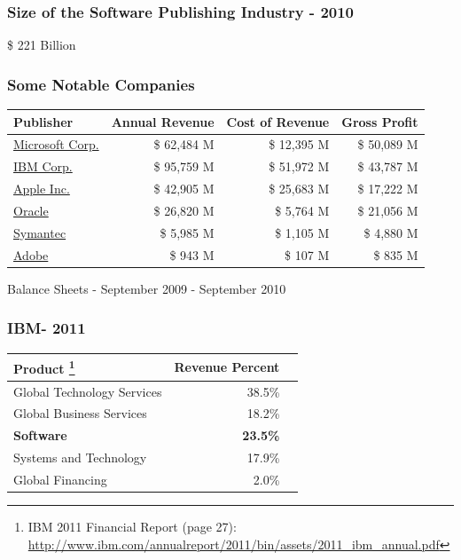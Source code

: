 \documentclass[18pt]{beamer}
\begin{document}
\begin{frame}
\frametitle{Size of the Software Publishing Industry - 2010}
\fontsize{72pt}{90pt}\selectfont
\begin{center}
\$ 221 Billion
\end{center}
\end{frame}


\begin{frame}
\frametitle{Some Notable Companies}
\begin{tabular}{lrrr}
\hline
\textbf{Publisher} & \textbf{Annual Revenue} & \textbf{Cost of Revenue} & \textbf{Gross Profit} \\
\hline
\hline
\href{http://www.google.com/finance?fstype=ii\&q=NASDAQ:MSFT}{Microsoft Corp.} & \$ 62,484 M & \$ 12,395 M  & \$ 50,089 M  \\
\hline
\href{http://www.google.com/finance?q=NYSE:IBM\&fstype=ii}{IBM Corp.} & \$ 95,759 M & \$ 51,972 M & \$ 43,787 M \\
\hline
\href{http://www.google.com/finance?q=NASDAQ:AAPL\&fstype=ii}{Apple Inc.} & \$ 42,905 M & \$ 25,683 M & \$ 17,222 M \\
\hline
\href{http://www.google.com/finance?q=NASDAQ:ORCL\&fstype=ii}{Oracle} & \$ 26,820 M & \$ 5,764 M & \$ 21,056 M \\
\hline
\href{http://www.google.com/finance?q=NASDAQ:SYMC\&fstype=ii}{Symantec} & \$ 5,985 M & \$ 1,105 M & \$ 4,880 M \\
\hline
\href{http://www.google.com/finance?q=NASDAQ:ADBE\&fstype=ii}{Adobe} & \$ 943 M & \$ 107 M & \$ 835 M \\
\hline
\end{tabular}
\bigskip
\begin{center}
Balance Sheets - September 2009 - September 2010
\end{center}
\end{frame}


{
\begin{frame}
\frametitle{IBM- 2011}
\begin{center}
\begin{tabular}{lrr}
\hline
\textbf{Product}
\footnote{IBM 2011 Financial Report (page 27):
\url{http://www.ibm.com/annualreport/2011/bin/assets/2011_ibm_annual.pdf}}
& \textbf{Revenue Percent} \\
\hline
\hline
Global Technology Services & 38.5\% \\
Global Business Services & 18.2\% \\
\textbf{Software} & \textbf{23.5\%}\\
Systems and Technology & 17.9\% \\
Global Financing & 2.0\% \\
\hline
\end{tabular}
\end{center}
\end{frame}
}
\end{document}
